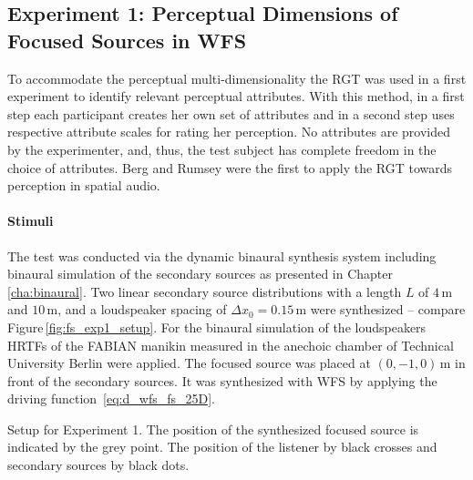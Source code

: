 \subsection[Perceptual Dimensions of Focused Sources]{Experiment 1: Perceptual
Dimensions of Focused Sources in
\ac{WFS}\autocite[This experiment was done in collaboration with Matthias Geier
and parts of this section are published in][]{Geier2010a}}
\label{sec:experiment1_perceptual_dimensions_of_focused_sources_in_wfs}

To accommodate the perceptual multi-dimensionality the \ac{RGT} was used in a first
experiment to identify relevant perceptual attributes.\autocite{Kelly1955}
With this method, in a first step each participant creates her own set of
attributes and in a second step uses respective attribute scales for rating
her perception. No attributes are provided by the experimenter, and, thus,
the test subject has complete freedom in the choice of attributes.
Berg and Rumsey were the first to apply the \ac{RGT} towards perception in
spatial audio.


\paragraph{Stimuli}
The test was conducted via the dynamic binaural synthesis system including
binaural simulation of the secondary sources as presented in
Chapter\,\ref{cha:binaural}.
Two linear secondary source distributions with a length $L$ of $4$\,m
and $10$\,m, and a loudspeaker spacing of
$\Delta x_0 = 0.15$\,m were synthesized -- compare Figure\,\ref{fig:fs_exp1_setup}.
For the binaural simulation of the loudspeakers \acp{HRTF} of the {\small FABIAN}
manikin measured in the anechoic chamber of Technical
University Berlin were applied.
The focused source was placed at $(0,-1,0)$\,m in front of the secondary
sources. It was synthesized with \twohalfD \ac{WFS} by applying the driving
function~\ref{eq:d_wfs_fs_25D}.
%
\begin{marginfigure}
    \ft
    
    \caption{Setup for Experiment 1. The position of the synthesized focused
    source is indicated by the grey point. The position of the listener by black
    crosses and secondary sources by black dots.
        }
    \label{fig:fs_exp1_setup}
\end{marginfigure}
%

